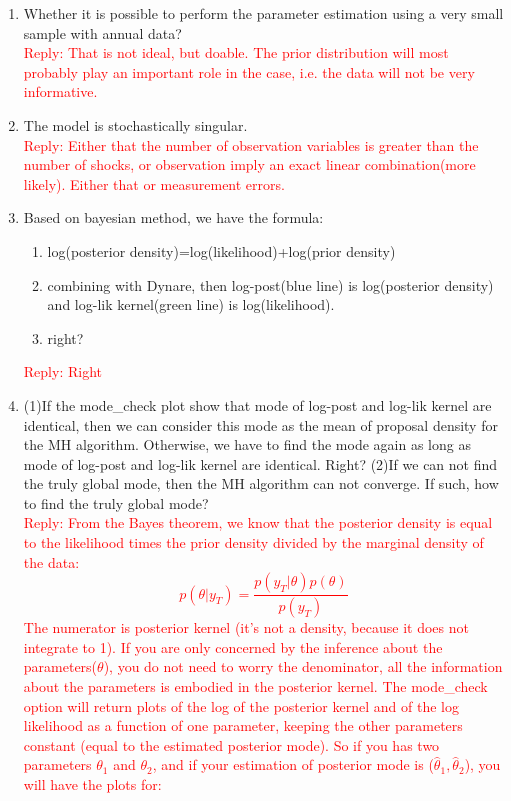 \documentclass[cn,10pt,math=newtx,citestyle=gb7714-2015,bibstyle=gb7714-2015]{elegantbook}
\begin{document}
{{	\begin{enumerate}
		\item Whether it is possible to perform the parameter estimation using a very small sample with annual data?\\
		\textcolor{red}{Reply: That is not ideal, but doable. The prior distribution will most probably play an important role in the case, i.e. the data will not be very informative.}
		\item The model is stochastically singular.\\
		\textcolor{red}{Reply: Either that the number of observation variables is greater than the number of shocks, or observation imply an exact linear combination(more likely). Either that or measurement errors.}
		\item Based on bayesian method, we have the formula:
		\begin{enumerate}
			\item log(posterior density)=log(likelihood)+log(prior density)
			\item combining with Dynare, then log-post(blue line) is log(posterior density) and log-lik kernel(green line) is log(likelihood).
			\item right?
		\end{enumerate}
		\textcolor{red}{Reply: Right}
		\item (1)If the mode\_check plot show that mode of log-post and log-lik kernel are identical, then we can consider this mode as the mean of proposal density for the MH algorithm. Otherwise, we have to find the mode again as long as mode of log-post and log-lik kernel are identical. Right? (2)If we can not find the truly global mode, then the MH algorithm can not converge. If  such, how to find the truly global mode?\\
		\textcolor{red}{Reply: From the Bayes theorem, we know that the posterior density is equal to the likelihood times the prior density divided by the marginal density of the data:
			$$p(\theta|y_T)=\frac{p(y_T|\theta)p(\theta)}{p(y_T)}$$
			The numerator is posterior kernel (it's not a density, because it does not integrate to 1). If you are only concerned by the inference about the parameters($\theta$), you do not need to worry the denominator, all the information about the parameters is embodied in the posterior kernel. The mode\_check option will return plots of the log of the posterior kernel and of the log likelihood as a function of one parameter, keeping the other parameters constant (equal to the estimated posterior mode). So if you has two parameters $\theta_1$ and $\theta_2$, and if your estimation of posterior mode is ($\hat{\theta}_1,\hat{\theta}_2$), you will have the plots for:
}
\end{enumerate}}}
\end{document}
